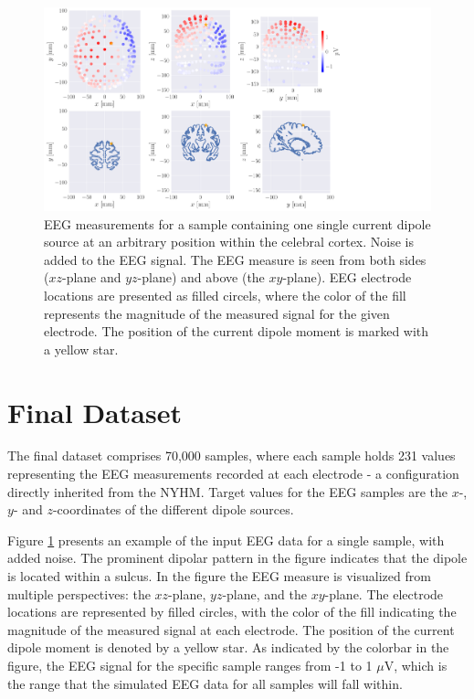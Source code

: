 \documentclass[a4paper, UKenglish, 11pt]{uiomaster}
\begin{document}
\begin{figure}[!htb]
    \centering
    \hspace*{-3cm}
    \includegraphics[width=18cm]{figures/simple/simple_example.pdf}
    \caption{EEG measurements for a sample containing one single current dipole source at an arbitrary position within the celebral cortex. Noise is added to the EEG signal. The EEG measure is seen from both sides ($xz$-plane and $yz$-plane) and above (the $xy$-plane). EEG electrode locations are presented as filled circels, where the color of the fill represents the magnitude of the measured signal for the given electrode. The position of the current dipole moment is marked with a yellow star.}
    \label{fig:eeg_field_1_dipole_example}
\end{figure}

\section{Final Dataset} \label{chap:final_data}
The final dataset comprises 70,000 samples, where each sample holds 231 values representing the EEG measurements recorded at each electrode - a configuration directly inherited from the NYHM. Target values for the EEG samples are the $x$-, $y$- and $z$-coordinates of the different dipole sources.

Figure \ref{fig:eeg_field_1_dipole_example} presents an example of the input EEG data for a single sample, with added noise. The prominent dipolar pattern in the figure indicates that the dipole is located within a sulcus. In the figure the EEG measure is visualized from multiple perspectives: the $xz$-plane, $yz$-plane, and the $xy$-plane. The electrode locations are represented by filled circles, with the color of the fill indicating the magnitude of the measured signal at each electrode. The position of the current dipole moment is denoted by a yellow star. As indicated by the colorbar in the figure, the EEG signal for the specific sample ranges from -1 to 1 $\mu$V, which is the range that the simulated EEG data for all samples will fall within.
\end{document}
